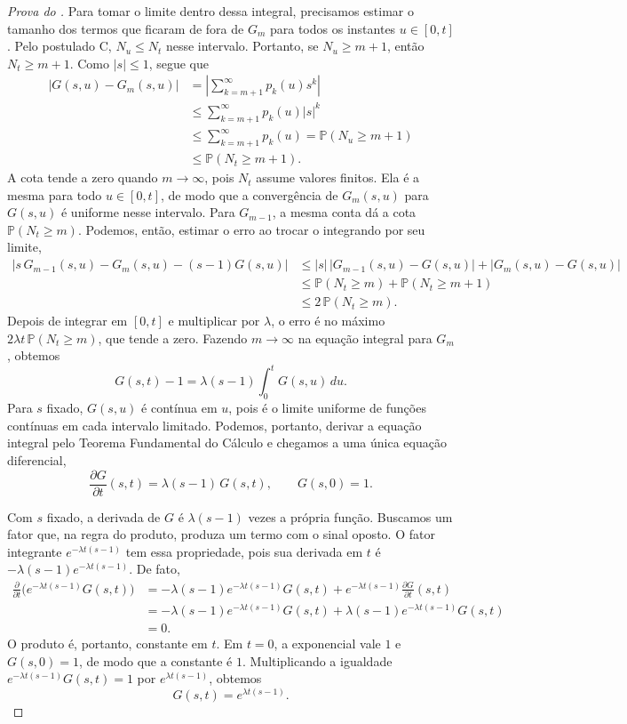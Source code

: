 \documentclass[12pt,portuguese]{article}
\theoremstyle{definition}
\theoremstyle{plainexercise}
\theoremstyle{starredexercise}
\theoremstyle{definition}
\begin{document}
\begin{proof}[Prova do ]
Para tomar o limite dentro dessa integral, precisamos estimar o tamanho
dos termos que ficaram de fora de $G_m$ para todos os instantes
$u\in[0,t]$. Pelo postulado C, $N_u\leqslant N_t$ nesse intervalo.
Portanto, se $N_u\geqslant m+1$, então $N_t\geqslant m+1$. Como
$|s|\leqslant1$, segue que
\begin{align*}
  \bigl|G(s,u)-G_m(s,u)\bigr|
  &=\left|\sum_{k=m+1}^{\infty}p_k(u)s^k\right|\\
  &\leqslant\sum_{k=m+1}^{\infty}p_k(u)|s|^k\\
  &\leqslant\sum_{k=m+1}^{\infty}p_k(u)
  =\mathbb{P}(N_u\geqslant m+1)\\
  &\leqslant\mathbb{P}(N_t\geqslant m+1).
\end{align*}
A cota tende a zero quando $m\to\infty$, pois $N_t$ assume valores finitos.
Ela é a mesma para todo $u\in[0,t]$, de modo que a convergência de
$G_m(s,u)$ para $G(s,u)$ é uniforme nesse intervalo. Para $G_{m-1}$,
a mesma conta dá a cota $\mathbb{P}(N_t\geqslant m)$. Podemos, então,
estimar o erro ao trocar o integrando por seu limite,
\begin{align*}
  \bigl|s\,G_{m-1}(s,u)\!-\!G_m(s,u)\!-\!(s-1)G(s,u)\bigr|
  &\leqslant |s|\,\bigl|G_{m-1}(s,u)\!-\!G(s,u)\bigr|
               +\bigl|G_m(s,u)-G(s,u)\bigr|
  \\[0.3cm]
  &\leqslant \mathbb{P}(N_t\geqslant m)+\mathbb{P}(N_t\geqslant m+1)
  \\[0.3cm]
  &\leqslant 2\,\mathbb{P}(N_t\geqslant m).
\end{align*}
Depois de integrar em $[0,t]$ e multiplicar por $\lambda$, o erro é no
máximo $2\lambda t\,\mathbb{P}(N_t\geqslant m)$, que tende a zero.
Fazendo $m\to\infty$ na equação integral para $G_m$, obtemos
\[
  G(s,t)-1=\lambda(s-1)\int_0^t G(s,u)\,du.
\]
Para $s$ fixado, $G(s,u)$ é contínua em $u$, pois é o limite uniforme
de funções contínuas em cada intervalo limitado. Podemos, portanto,
derivar a equação integral pelo Teorema Fundamental do Cálculo e chegamos
a uma única equação diferencial,
\[
  \frac{\partial G}{\partial t}(s,t)
  =\lambda(s-1)\,G(s,t),\qquad G(s,0)=1.
\]

Com $s$ fixado, a derivada de $G$ é $\lambda(s-1)$ vezes a própria função.
Buscamos um fator que, na regra do produto, produza um termo com o sinal
oposto. O fator integrante $e^{-\lambda t(s-1)}$ tem essa propriedade,
pois sua derivada em $t$ é $-\lambda(s-1)e^{-\lambda t(s-1)}$. De fato,
\begin{align*}
  \frac{\partial}{\partial t}\bigl(e^{-\lambda t(s-1)}G(s,t)\bigr)
  &=-\lambda(s-1)e^{-\lambda t(s-1)}G(s,t)
    +e^{-\lambda t(s-1)}\frac{\partial G}{\partial t}(s,t)\\
  &=-\lambda(s-1)e^{-\lambda t(s-1)}G(s,t)
    +\lambda(s-1)e^{-\lambda t(s-1)}G(s,t)\\
  &=0.
\end{align*}
O produto é, portanto, constante em $t$. Em $t=0$, a exponencial vale $1$
e $G(s,0)=1$, de modo que a constante é $1$. Multiplicando a igualdade
$e^{-\lambda t(s-1)}G(s,t)=1$ por $e^{\lambda t(s-1)}$, obtemos
\[
  G(s,t)=e^{\lambda t(s-1)}.
\]


\end{proof}
\end{document}
